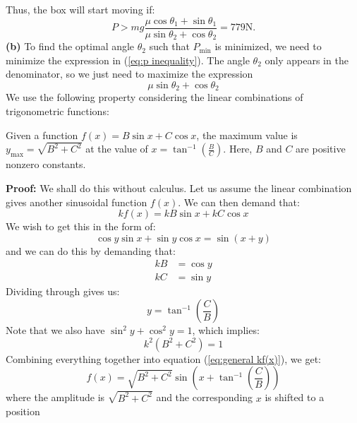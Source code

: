 \documentclass{article}
\begin{document}
Thus, the box will start moving if:
\begin{equation}
    P > mg\frac{\mu\cos\theta_1+\sin\theta_1}{\mu\sin\theta_2+\cos\theta_2} =779 \si{\newton}.
    \label{eq:p inequality}
\end{equation}
\textbf{(b)} To find the optimal angle $\theta_2$ such that $P_\text{min}$ is minimized, we need to minimize the expression in (\ref{eq:p inequality}). The angle $\theta_2$ only appears in the denominator, so we just need to maximize the expression
\begin{equation}
    \mu\sin\theta_2+\cos\theta_2
    \label{eq:}
\end{equation}
We use the following property considering the linear combinations of trigonometric functions:
\begin{property}
    Given a function $f(x)=B\sin x+C\cos x$, the maximum value is $y_\text{max}=\sqrt{B^2+C^2}$ at the value of $x=\tan^{-1}\left(\frac{B}{C}\right)$. Here, $B$ and $C$ are positive nonzero constants.
\end{property}
\textbf{Proof:} We shall do this without calculus. Let us assume the linear combination gives another sinusoidal function $f(x)$. We can then demand that:
\begin{equation}
    kf(x)=kB\sin x+kC\cos x
    \label{eq:general kf(x)}
\end{equation}
We wish to get this in the form of:
\begin{equation}
    \cos y \sin x + \sin y \cos x = \sin(x+y)
    \label{eq:}
\end{equation}
and we can do this by demanding that:
\begin{align}
    kB&=\cos y \\
    kC&=\sin y
\end{align}
Dividing through gives us:
\begin{equation}
    y=\tan^{-1}\left(\frac{C}{B}\right)
    \label{eq:}
\end{equation}
Note that we also have $\sin^2 y+\cos^2 y=1$, which implies:
\begin{equation}
    k^2\left(B^2+C^2\right)=1
    \label{eq:}
\end{equation}
Combining everything together into equation (\ref{eq:general kf(x)}), we get:
\begin{equation}
    f(x)=\sqrt{B^2+C^2}\sin\left(x+\tan^{-1}\left(\frac{C}{B}\right)\right)
    \label{eq:}
\end{equation}
where the amplitude is $\sqrt{B^2+C^2}$ and the corresponding $x$ is shifted to a position
\end{document}
